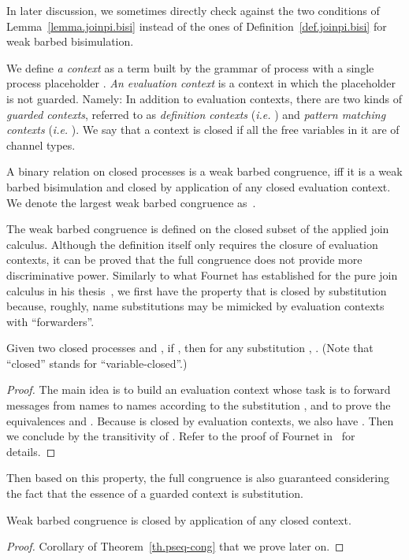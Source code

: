 \documentclass{LMCS}
\makeatletter
\newcommand{\forget}[1]{}
\newcommand{\ie}{\emph{i.e.}\@\xspace}
\renewcommand{\_}{\mathord{\rule[-.25ex]{1ex}{.15ex}}}
\makeatother
\begin{document}
In later discussion, we sometimes directly check against the two
conditions of Lemma~\ref{lemma.joinpi.bisi} instead of the ones
of Definition~\ref{def.joinpi.bisi} for weak barbed bisimulation.

We define \emph{a context} as a term built by the grammar of process
with a single process placeholder .  \emph{An evaluation
  context}  is a context in which the placeholder is
not guarded. Namely: 
In addition to evaluation contexts,
there are two kinds of \emph{guarded contexts},
referred to as \emph{definition contexts} (\ie
) and \emph{pattern matching contexts} (\ie
).
We say that a context is closed if all the free variables in it are of
channel types.
\begin{defi}
  A binary relation on closed processes is a weak barbed congruence, iff
  it is a weak barbed bisimulation and closed by application of any
  closed evaluation context. We denote the largest weak barbed
  congruence as~.
\end{defi}
The weak barbed congruence  is defined on the closed subset of
the applied join calculus. Although the definition itself only
requires the closure of evaluation contexts, it can be proved that the
full congruence does not provide more discriminative power. Similarly
to what Fournet has established for the pure join calculus in his
thesis~\cite{Fournet98:PhD}, we first have the property that  is
closed by substitution because, roughly, name substitutions may be
mimicked by evaluation contexts with ``forwarders''.
\begin{lem}\label{lemma.wbcsub}
  Given two closed processes  and , if , then for any
  substitution , .
 (Note that ``closed'' stands for ``variable-closed''.)
\end{lem}
\begin{proof}
  The main idea is to build an evaluation context 
  whose task is to forward messages from names to names
  according to the substitution , and to prove the
  equivalences  and . Because  is closed by evaluation contexts, we
  also have . Then we
  conclude by the transitivity of . 
  Refer to the proof of Fournet in~\cite[Lemma 4.14 of Chapter
  4]{Fournet98:PhD} for details. \forget{\qed}
\end{proof}
Then based on this property, the full congruence is also
guaranteed considering the fact that the essence of a guarded
  context is substitution.
\begin{thm}\label{th.wbcfull}
  Weak barbed congruence  is closed by application of any
  closed context.
\end{thm}
\begin{proof}
  Corollary of
  Theorem~\ref{th.pseq-cong} that we prove later on. \forget{\qed}
\end{proof}
\end{document}
